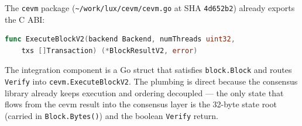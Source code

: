 The \texttt{cevm} package
(\texttt{\textasciitilde/work/lux/cevm/cevm.go} at SHA \texttt{4d652b2})
already exports the C ABI:

\begin{lstlisting}[basicstyle=\ttfamily\footnotesize, language=go]
func ExecuteBlockV2(backend Backend, numThreads uint32,
    txs []Transaction) (*BlockResultV2, error)
\end{lstlisting}

The integration component is a Go struct that satisfies \texttt{block.Block}
and routes \texttt{Verify} into \texttt{cevm.ExecuteBlockV2}. The plumbing
is direct because the consensus library already keeps execution and
ordering decoupled --- the only state that flows from the cevm result
into the consensus layer is the 32-byte state root (carried in
\texttt{Block.Bytes()}) and the boolean \texttt{Verify} return.


